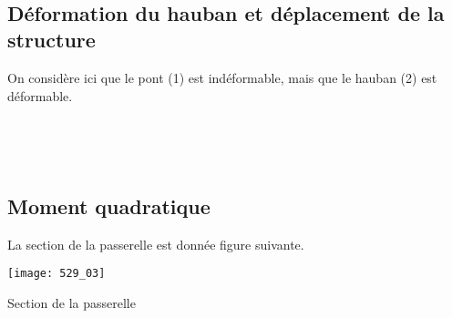 \ifprof
\begin{corrige}~\\
\end{corrige}
\else
\fi


\subsection*{Déformation du hauban et déplacement de la structure}
On considère ici que le pont (1) est indéformable, mais que le hauban (2) est déformable. 

\ifprof
\begin{corrige}~\\
\end{corrige}
\else
\fi

\ifprof
\begin{corrige}~\\
\end{corrige}
\else
\fi

\subsection*{Moment quadratique}
La section de la passerelle est donnée figure suivante. 
\begin{marginfigure}
\texttt{[image: 529\_03]}

\caption{Section de la passerelle}
\end{marginfigure}





\ifprof
\else


\fi

